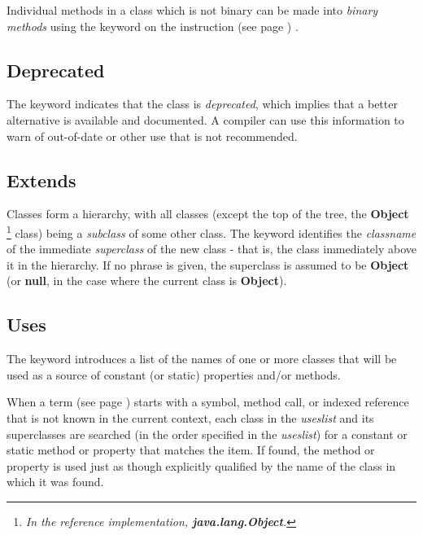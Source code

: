 Individual methods in a class which is not binary can be made into
\emph{binary methods} using the  keyword on the
  instruction (see page \pageref{refmethod}) .
\subsection{Deprecated}\label{refdepcla}
 
The keyword  indicates that the class
is \emph{deprecated}, which implies that a better alternative is
available and documented.  A compiler can use this information to warn
of out-of-date or other use that is not recommended.
\subsection{Extends}
 
Classes form a hierarchy, with all classes (except the top of the tree,
the \textbf{Object}
\footnote{
\emph{In the reference implementation, \textbf{java.lang.Object}.}
}
class) being a \emph{subclass} of some other class.
The  keyword identifies the \emph{classname} of the
immediate \emph{superclass} of the new class - that is, the
class immediately above it in the hierarchy.
If no  phrase is given, the superclass is assumed to
be \textbf{Object} (or \textbf{null}, in the case where the current
class is \textbf{Object}).
\subsection{Uses}
 
The  keyword introduces a list of the names of one or
more classes that will be used as a source of constant (or static)
properties and/or methods.
 
When a  term (see page \pageref{refterms})  starts with a symbol, method call, or
indexed reference that is not known in the current context, each class
in the \emph{useslist} and its superclasses are searched (in the
order specified in the \emph{useslist}) for a constant or static
method or property that matches the item.
If found, the method or property is used just as though explicitly
qualified by the name of the class in which it was found.
 
